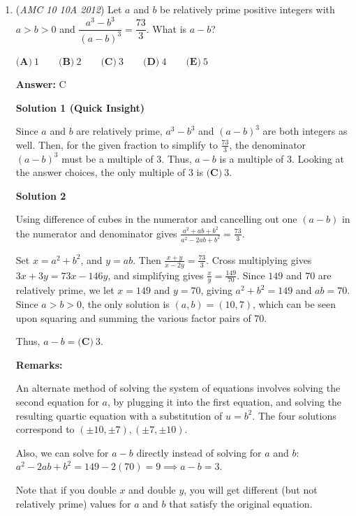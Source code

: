 \begin{enumerate}
 


	\item (\textit{AMC 10 10A 2012}) Let $a$ and $b$ be relatively prime positive integers with $a>b>0$ and $\dfrac{a^3-b^3}{(a-b)^3} = \dfrac{73}{3}$. What is $a-b$?


 $\textbf{(A)}\ 1\qquad\textbf{(B)}\ 2\qquad\textbf{(C)}\ 3\qquad\textbf{(D)}\ 4\qquad\textbf{(E)}\ 5$

 \textbf{Answer: }C



\textbf{Solution 1 (Quick Insight)}

Since $a$ and $b$ are relatively prime, $a^3-b^3$ and $(a-b)^3$ are both integers as well. Then, for the given fraction to simplify to $\frac{73}{3}$, the denominator $(a-b)^3$ must be a multiple of $3.$ Thus, $a-b$ is a multiple of $3$. Looking at the answer choices, the only multiple of $3$ is $\boxed{\textbf{(C)}\ 3}$.

 



\textbf{Solution 2}

Using difference of cubes in the numerator and cancelling out one $(a-b)$ in the numerator and denominator gives $\frac{a^2 + ab + b^2}{a^2 - 2ab + b^2} = \frac{73}{3}$.

 Set $x = a^2 + b^2$, and $y = ab$.  Then $\frac{x + y}{x - 2y} = \frac{73}{3}$.  Cross multiplying gives $3x + 3y = 73x - 146y$, and simplifying gives $\frac{x}{y} = \frac{149}{70}$.  Since $149$ and $70$ are relatively prime, we let $x = 149$ and $y = 70$, giving $a^2 + b^2 = 149$ and $ab = 70$.  Since $a>b>0$, the only solution is $(a,b) = (10, 7)$, which can be seen upon squaring and summing the various factor pairs of $70$.

 Thus, $a - b = \boxed{\textbf{(C)}\ 3}$.

 \textbf{Remarks:}

 An alternate method of solving the system of equations involves solving the second equation for $a$, by plugging it into the first equation, and solving the resulting quartic equation with a substitution of $u = b^2$.  The four solutions correspond to $(\pm10, \pm7), (\pm7, \pm10).$ 

 Also, we can solve for $a-b$ directly instead of solving for $a$ and $b$: $a^2-2ab+b^2=149-2(70)=9 \implies a-b=3.$

 Note that if you double $x$ and double $y$, you will get different (but not relatively prime) values for $a$ and $b$ that satisfy the original equation.


\end{enumerate}
